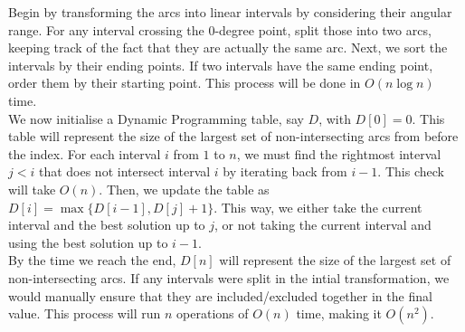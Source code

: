\documentclass{article}
\begin{document}
\begin{solution}
Begin by transforming the arcs into linear intervals by considering their angular range. For any interval crossing the $0$-degree point, split those into two arcs, keeping track of the fact that they are actually the same arc. Next, we sort the intervals by their ending points. If two intervals have the same ending point, order them by their starting point. This process will be done in $O(n \log n)$ time.\\

We now initialise a Dynamic Programming table, say $D$, with $D[0] = 0$. This table will represent the size of the largest set of non-intersecting arcs from before the index. For each interval $i$ from $1$ to $n$, we must find the rightmost interval $j < i$ that does not intersect interval $i$ by iterating back from $i-1$. This check will take $O(n)$. Then, we update the table as $D[i] = \max \{D[i-1], D[j] +1\}$. This way, we either take the current interval and the best solution up to $j$, or not taking the current interval and using the best solution up to $i-1$.\\

By the time we reach the end, $D[n]$ will represent the size of the largest set of non-intersecting arcs. If any intervals were split in the intial transformation, we would manually ensure that they are included/excluded together in the final value. This process will run $n$ operations of $O(n)$ time, making it $O(n^2)$.
\end{solution}
\end{document}
